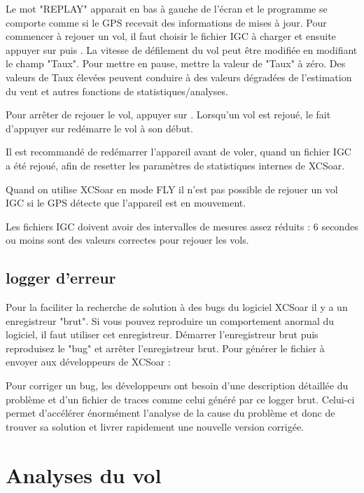 Le mot "REPLAY" apparait en bas à gauche de l'écran et le programme se comporte comme si le GPS  recevait des informations de mises à jour.
Pour commencer à rejouer un vol, il faut choisir le fichier IGC à charger et ensuite appuyer sur  puis . La vitesse de défilement du vol peut être modifiée en modifiant le champ "Taux". Pour mettre en pause, mettre la valeur de "Taux" à zéro. Des valeurs de Taux élevées peuvent conduire à des valeurs dégradées de l'estimation du vent et autres fonctions de statistiques/analyses.

Pour arrêter de rejouer le vol, appuyer sur .
Lorsqu'un vol est rejoué, le fait d'appuyer sur  redémarre le vol à son début.

\tip Il est recommandé de redémarrer l'appareil avant de voler, quand un fichier IGC a été rejoué, afin de resetter les paramètres de statistiques internes de XCSoar.

Quand on utilise XCSoar en mode FLY il n'est pas possible de rejouer un vol IGC si le GPS détecte que l'appareil est en mouvement.

Les fichiers IGC doivent avoir des intervalles de mesures assez réduits : 6 secondes ou moins sont des valeurs correctes pour rejouer les vols.


\subsection*{logger d'erreur}\label{sec:raw-logger}
Pour la faciliter la recherche de solution à des bugs du logiciel XCSoar il y a un enregistreur "brut". Si vous pouvez reproduire un comportement anormal du logiciel, il faut utiliser cet enregistreur. Démarrer l'enregistreur brut puis reproduisez le "bug" et arrêter l'enregistreur brut. Pour générer le fichier à envoyer aux développeurs de XCSoar :
\begin{quote}
\blink{}
\end{quote}
Pour corriger un bug, les développeurs ont besoin d'une description détaillée du problème et d'un fichier de traces comme celui généré par ce logger brut. Celui-ci permet d'accélérer énormément l'analyse de la cause du problème et donc de trouver sa solution et livrer rapidement une nouvelle version corrigée.

\section{Analyses du vol} \label{sec:analysis-climb}

